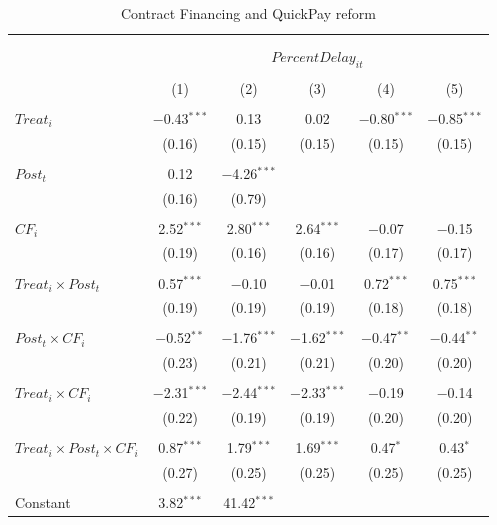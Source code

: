 \documentclass[
]{article}
\begin{document}
\begin{table}[H] \centering 
  \caption{Contract Financing and QuickPay reform} 
  \label{} 
\small 
\begin{tabular}{@{\extracolsep{-2pt}}lccccc} 
\\[-1.8ex]\hline 
\hline \\[-1.8ex] 
\\[-1.8ex] & \multicolumn{5}{c}{$PercentDelay_{it}$  } \\ 
\\[-1.8ex] & (1) & (2) & (3) & (4) & (5)\\ 
\hline \\[-1.8ex] 
 $Treat_i$ & $-$0.43$^{***}$ & 0.13 & 0.02 & $-$0.80$^{***}$ & $-$0.85$^{***}$ \\ 
  & (0.16) & (0.15) & (0.15) & (0.15) & (0.15) \\ 
  & & & & & \\ 
 $Post_t$ & 0.12 & $-$4.26$^{***}$ &  &  &  \\ 
  & (0.16) & (0.79) &  &  &  \\ 
  & & & & & \\ 
 $CF_i$ & 2.52$^{***}$ & 2.80$^{***}$ & 2.64$^{***}$ & $-$0.07 & $-$0.15 \\ 
  & (0.19) & (0.16) & (0.16) & (0.17) & (0.17) \\ 
  & & & & & \\ 
 $Treat_i \times Post_t$ & 0.57$^{***}$ & $-$0.10 & $-$0.01 & 0.72$^{***}$ & 0.75$^{***}$ \\ 
  & (0.19) & (0.19) & (0.19) & (0.18) & (0.18) \\ 
  & & & & & \\ 
 $Post_t \times CF_i$ & $-$0.52$^{**}$ & $-$1.76$^{***}$ & $-$1.62$^{***}$ & $-$0.47$^{**}$ & $-$0.44$^{**}$ \\ 
  & (0.23) & (0.21) & (0.21) & (0.20) & (0.20) \\ 
  & & & & & \\ 
 $Treat_i \times CF_i$ & $-$2.31$^{***}$ & $-$2.44$^{***}$ & $-$2.33$^{***}$ & $-$0.19 & $-$0.14 \\ 
  & (0.22) & (0.19) & (0.19) & (0.20) & (0.20) \\ 
  & & & & & \\ 
 $Treat_i \times Post_t \times CF_i$ & 0.87$^{***}$ & 1.79$^{***}$ & 1.69$^{***}$ & 0.47$^{*}$ & 0.43$^{*}$ \\ 
  & (0.27) & (0.25) & (0.25) & (0.25) & (0.25) \\ 
  & & & & & \\ 
 Constant & 3.82$^{***}$ & 41.42$^{***}$ &  &  &  \\ 

\end{tabular}
\end{table}
\end{document}
